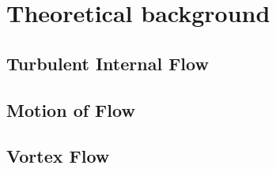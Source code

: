 
\chapter{Theoretical background}

\section{Turbulent Internal Flow}

\section{Motion of Flow}

\section{Vortex Flow}

\clearpage %
